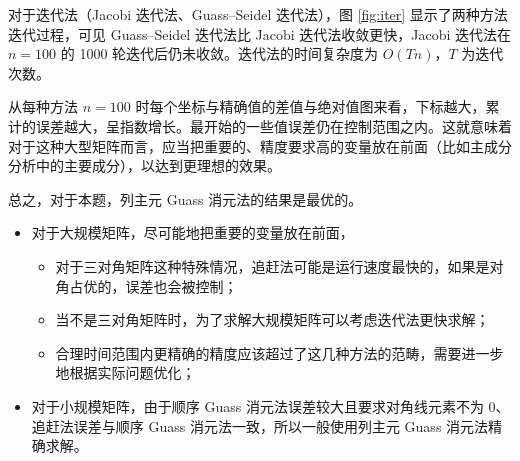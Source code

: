 \documentclass{sjtuarticle}
\begin{document}
对于迭代法（Jacobi 迭代法、Guass--Seidel 迭代法），图 \ref{fig:iter} 显示了两种方法迭代过程，可见 Guass--Seidel 迭代法比 Jacobi 迭代法收敛更快，Jacobi 迭代法在 $n=100$ 的 1000 轮迭代后仍未收敛。迭代法的时间复杂度为 $O(Tn)$，$T$ 为迭代次数。

从每种方法 $n=100$ 时每个坐标与精确值的差值与绝对值图来看，下标越大，累计的误差越大，呈指数增长。最开始的一些值误差仍在控制范围之内。这就意味着对于这种大型矩阵而言，应当把重要的、精度要求高的变量放在前面（比如主成分分析中的主要成分），以达到更理想的效果。

总之，对于本题，列主元 Guass 消元法的结果是最优的。
\begin{itemize}
    \item 对于大规模矩阵，尽可能地把重要的变量放在前面，
    \begin{itemize}
        \item 对于三对角矩阵这种特殊情况，追赶法可能是运行速度最快的，如果是对角占优的，误差也会被控制；
        \item 当不是三对角矩阵时，为了求解大规模矩阵可以考虑迭代法更快求解；
        \item 合理时间范围内更精确的精度应该超过了这几种方法的范畴，需要进一步地根据实际问题优化；
    \end{itemize}
    \item 对于小规模矩阵，由于顺序 Guass 消元法误差较大且要求对角线元素不为 0、追赶法误差与顺序 Guass 消元法一致，所以一般使用列主元 Guass 消元法精确求解。
\end{itemize}
\end{document}
